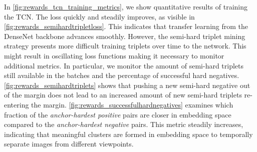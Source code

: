 \documentclass[\home/main.tex]{subfiles}
\begin{document}
In \cref{fig:rewards_tcn_training_metrics}, we show quantitative results of training the TCN. The loss quickly and steadily improves, as visible in \cref{fig:rewards_semihardtripletloss}. This indicates that transfer learning from the DenseNet backbone advances smoothly. However, the semi-hard triplet mining strategy presents more difficult training triplets over time to the network. This might result in oscillating loss functions making it necessary to monitor additional metrics. In particular, we monitor the amount of semi-hard triplets still available in the batches and the percentage of successful hard negatives. \cref{fig:rewards_semihardtriplets} shows that pushing a new semi-hard negative out of the margin does not lead to an increased amount of new semi-hard triplets re-entering the margin. \cref{fig:rewards_successfulhardnegatives} examines which fraction of the \textit{anchor-hardest positive} pairs are closer in embedding space compared to the \textit{anchor-hardest negative} pairs. This metric steadily increases, indicating that meaningful clusters are formed in embedding space to temporally separate images from different viewpoints.
\end{document}
